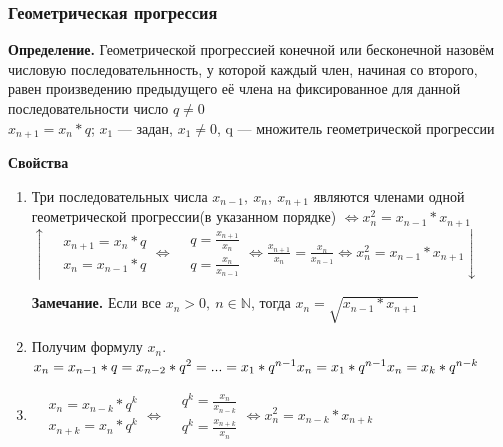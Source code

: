 \documentclass{article}
\begin{document}
    \subsubsection{Геометрическая прогрессия}
    
    \textbf{Определение.} Геометрической прогрессией конечной или бесконечной назовём числовую последовательнность, у которой каждый член, начиная со второго, равен произведению предыдущего её члена на фиксированное для данной последовательности число \(q \not = 0\)
    \\ \(x_{n+1} = x_n * q\); \(x_1\) --- задан, \(x_1 \not = 0\), q --- множитель геометрической прогрессии
    
    \textbf{Свойства}
    
    \begin{enumerate}
    	\item Три последовательных числа \(x_{n-1},\ x_n,\ x_{n+1}\) являются членами одной геометрической прогрессии(в указанном порядке) \(\Leftrightarrow x_n^2 = x_{n-1}*x_{n+1}\)
        \\ \(\uparrow \begin{aligned}
				&x_{n+1} = x_n * q\\
				&x_n = x_{n-1} * q
			\end{aligned} \Leftrightarrow
            \begin{aligned}
				&q = \frac{x_{n+1}}{x_n}\\
				&q = \frac{x_{n}}{x_{n-1}}
			\end{aligned} \Leftrightarrow \frac{x_{n+1}}{x_n} = \frac{x_n}{x_{n-1}} \Leftrightarrow x_n^2 = x_{n-1} * x_{n+1} \downarrow\)
            
            \textbf{Замечание.} Если все \(x_n > 0,\ n \in \mathbb{N}\), тогда \(x_n = \sqrt{x_{n-1}*x_{n+1}}\)
        
        \item Получим формулу \(x_n\).
        \\ \(x_n = x_{n-1}*q = x_{n-2} * q^2 = ... = x_1 * q^{n-1}\\ x_n = x_1 * q^{n-1}\\ x_n = x_k * q^{n-k}\)

        \item \(\begin{aligned}
				&x_n = x_{n-k}*q^k\\
				&x_{n+k} = x_n*q^k
			\end{aligned} \Leftrightarrow
            \begin{aligned}
				&q^k = \frac{x_n}{x_{n-k}}\\
				&q^k = \frac{x_{n+k}}{x_n}
			\end{aligned} \Leftrightarrow x_n^2 = x_{n-k}*x_{n+k}\)
        

\end{enumerate}
\end{document}
